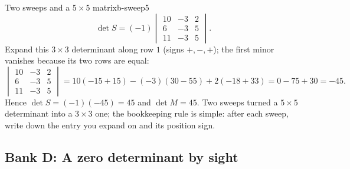 \documentclass[11pt]{article}
\begin{document}
\begin{exmp}{Two sweeps and a $5\times5$ matrix}{b-sweep5}
\[
\det S=(-1)\begin{vmatrix}10&-3&2\\6&-3&5\\11&-3&5\end{vmatrix}.
\]
Expand this $3\times3$ determinant along row $1$ (signs $+,-,+$); the first minor vanishes because its two rows are equal:
\[
\begin{vmatrix}10&-3&2\\6&-3&5\\11&-3&5\end{vmatrix}=10(-15+15)-(-3)(30-55)+2(-18+33)=0-75+30=-45.
\]
Hence $\det S=(-1)(-45)=45$ and $\det M=45$. Two sweeps turned a $5\times5$ determinant into a $3\times3$ one; the bookkeeping rule is simple: after each sweep, write down the entry you expand on and its position sign.
\end{exmp}

\subsection*{Bank D: A zero determinant by sight}
\end{document}
